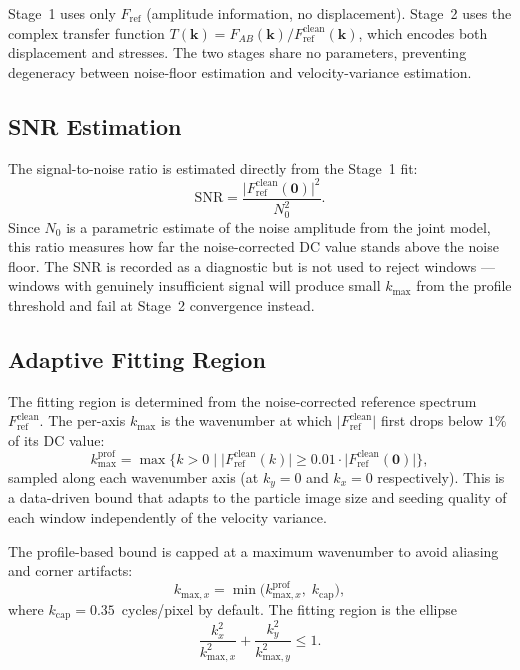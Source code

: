 \documentclass[11pt,a4paper]{article}
\newcommand{\kv}{\mathbf{k}}
\newcommand{\Fref}{F_\mathrm{ref}}
\newcommand{\Fclean}{F_\mathrm{ref}^\mathrm{clean}}
\begin{document}
Stage~1 uses only $\Fref$ (amplitude information, no displacement).
Stage~2 uses the complex transfer function $T(\kv) = F_{AB}(\kv) / \Fclean(\kv)$, which encodes both displacement and stresses.
The two stages share no parameters, preventing degeneracy between noise-floor estimation and velocity-variance estimation.

\subsection{SNR Estimation}

The signal-to-noise ratio is estimated directly from the Stage~1 fit:
%
\begin{equation}
    \mathrm{SNR} = \frac{\lvert\Fclean(\mathbf{0})\rvert^2}{N_0^2}.
    \label{eq:snr}
\end{equation}
%
Since $N_0$ is a parametric estimate of the noise amplitude from the joint model, this ratio measures how far the noise-corrected DC value stands above the noise floor.
The SNR is recorded as a diagnostic but is not used to reject windows --- windows with genuinely insufficient signal will produce small $k_\mathrm{max}$ from the profile threshold and fail at Stage~2 convergence instead.

\subsection{Adaptive Fitting Region}

The fitting region is determined from the noise-corrected reference spectrum $\Fclean$.
The per-axis $k_\mathrm{max}$ is the wavenumber at which $\lvert\Fclean\rvert$ first drops below $1\%$ of its DC value:
%
\begin{equation}
    k_\mathrm{max}^\mathrm{prof} = \max\bigl\{k > 0 \;\big\vert\; \lvert\Fclean(k)\rvert \geq 0.01 \cdot \lvert\Fclean(\mathbf{0})\rvert\bigr\},
    \label{eq:kmax_prof}
\end{equation}
%
sampled along each wavenumber axis (at $k_y = 0$ and $k_x = 0$ respectively).
This is a data-driven bound that adapts to the particle image size and seeding quality of each window independently of the velocity variance.

The profile-based bound is capped at a maximum wavenumber to avoid aliasing and corner artifacts:
%
\begin{equation}
    k_{\mathrm{max},x} = \min\!\bigl(k_{\mathrm{max},x}^\mathrm{prof},\; k_\mathrm{cap}\bigr),
    \label{eq:kmax_combined}
\end{equation}
%
where $k_\mathrm{cap} = 0.35$~cycles/pixel by default.
The fitting region is the ellipse
%
\begin{equation}
    \frac{k_x^2}{k_{\mathrm{max},x}^2} + \frac{k_y^2}{k_{\mathrm{max},y}^2} \leq 1.
    \label{eq:ellipse}
\end{equation}
\end{document}
